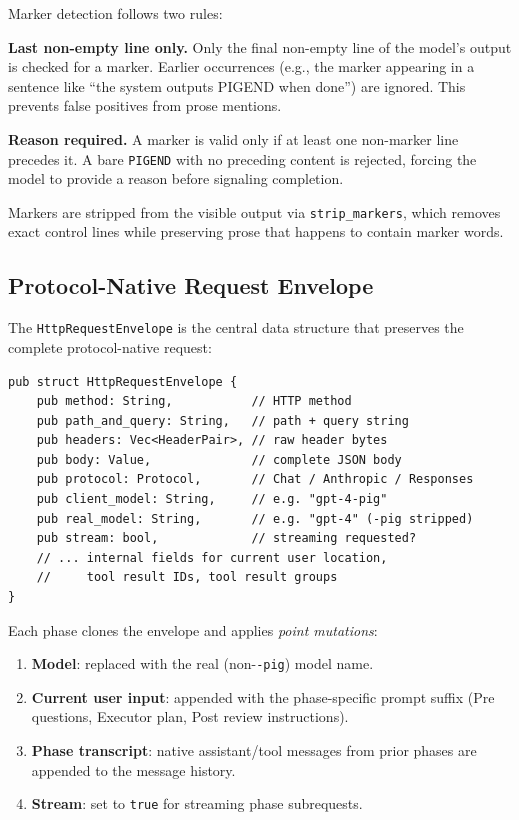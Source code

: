 Marker detection follows two rules:

\textbf{Last non-empty line only.} Only the final non-empty line of the model's output is checked for a marker. Earlier occurrences (e.g., the marker appearing in a sentence like ``the system outputs PIGEND when done'') are ignored. This prevents false positives from prose mentions.

\textbf{Reason required.} A marker is valid only if at least one non-marker line precedes it. A bare \texttt{PIGEND} with no preceding content is rejected, forcing the model to provide a reason before signaling completion.

Markers are stripped from the visible output via \texttt{strip\_markers}, which removes exact control lines while preserving prose that happens to contain marker words.

\subsection{Protocol-Native Request Envelope}
\label{sec:envelope}

The \texttt{HttpRequestEnvelope} is the central data structure that preserves the complete protocol-native request:

\begin{lstlisting}
pub struct HttpRequestEnvelope {
    pub method: String,           // HTTP method
    pub path_and_query: String,   // path + query string
    pub headers: Vec<HeaderPair>, // raw header bytes
    pub body: Value,              // complete JSON body
    pub protocol: Protocol,       // Chat / Anthropic / Responses
    pub client_model: String,     // e.g. "gpt-4-pig"
    pub real_model: String,       // e.g. "gpt-4" (-pig stripped)
    pub stream: bool,             // streaming requested?
    // ... internal fields for current user location,
    //     tool result IDs, tool result groups
}
\end{lstlisting}

Each phase clones the envelope and applies \emph{point mutations}:

\begin{enumerate}[nosep]
    \item \textbf{Model}: replaced with the real (non-\texttt{-pig}) model name.
    \item \textbf{Current user input}: appended with the phase-specific prompt suffix (Pre questions, Executor plan, Post review instructions).
    \item \textbf{Phase transcript}: native assistant/tool messages from prior phases are appended to the message history.
    \item \textbf{Stream}: set to \texttt{true} for streaming phase subrequests.
\end{enumerate}

